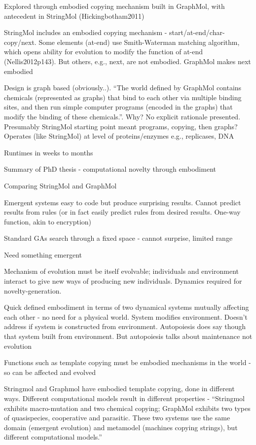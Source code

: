 Explored through embodied copying mechanism built in GraphMol, with antecedent in StringMol (Hickingbotham2011)

StringMol includes an embodied copying mechanism - start/at-end/char-copy/next. Some elements (at-end) use Smith-Waterman matching algorithm, which opens ability for evolution to modify the function of at-end (Nellis2012p143). But others, e.g., next, are not embodied. GraphMol makes next embodied

Design is graph based (obviously..). ``The world defined by GraphMol contains chemicals (represented as graphs) that bind to each other via multiple binding sites, and then run simple computer programs (encoded in the graphs) that modify the binding of these chemicals.''. Why? No explicit rationale presented. Presumably StringMol starting point meant programs, copying, then graphs? 
Operates (like StringMol) at level of proteins/enzymes e.g., replicases, DNA

Runtimes in weeks to months

\parencite{Nellis2014}

Summary of PhD thesis - computational novelty through embodiment

Comparing StringMol and GraphMol

Emergent systems easy to code but produce surprising results. Cannot predict results from rules (or in fact easily predict rules from desired results. One-way function, akin to encryption)

Standard GAs search through a fixed space - cannot surprise, limited range

Need something emergent

Mechanism of evolution must be itself evolvable; individuals and environment interact to give new ways of producing new individuals.
Dynamics required for novelty-generation.

Quick defined embodiment in terms of two dynamical systems mutually affecting each other - no need for a physical world. System modifies environment. Doesn't address if system is constructed from environment. Autopoiesis does say though that system built from environment. But autopoiesis talks about maintenance not evolution

Functions such as template copying must be embodied mechanisms in the world - so can be affected and evolved

Stringmol and Graphmol have embodied template copying, done in different ways. Different computational models result in different properties - ``Stringmol exhibits macro-mutation and two chemical copying; GraphMol exhibits two types of quasispecies, cooperative and parasitic. These two systems use the same domain (emergent evolution) and metamodel (machines copying strings), but different computational models.''

